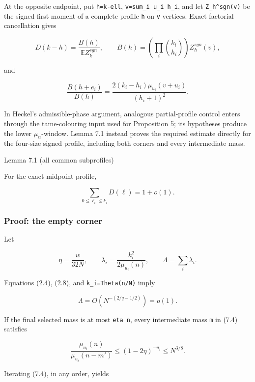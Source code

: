 \documentclass[
  11pt,
  a4paper,
]{article}
\begin{document}
At the opposite endpoint, put \texttt{h=k-ell},
\texttt{v=sum\_i\ u\_i\ h\_i}, and let \texttt{Z\_h\^{}sgn(v)} be the
signed first moment of a complete profile \texttt{h} on \texttt{v}
vertices. Exact factorial cancellation gives

\[
 D(k-h)=\frac{B(h)}{\mathbb EZ_k^{sgn}},\qquad
 B(h)=\left(\prod_i\binom{k_i}{h_i}\right)Z_h^{sgn}(v), \tag{7.5}
\]

and

\[
 \frac{B(h+e_i)}{B(h)}
 =\frac{2(k_i-h_i)\mu_{u_i}(v+u_i)}{(h_i+1)^2}.          \tag{7.6}
\]

In Heckel's admissible-phase argument, analogous partial-profile control
enters through the tame-colouring input used for Proposition 5; its
hypotheses produce the lower \(\mu_\alpha\)-window. Lemma 7.1 instead
proves the required estimate directly for the four-size signed profile,
including both corners and every intermediate mass.

{}
\label{lemma-7.1-all-common-subprofiles}
\begin{lemmabox}{Lemma 7.1 (all common subprofiles)}

For the exact midpoint profile,

\[
 \sum_{0\le\ell_i\le k_i}D(\ell)=1+o(1).               \tag{7.7}
\]

\end{lemmabox}

\subsubsection{Proof: the empty corner}\label{proof-the-empty-corner}

Let

\[
 \eta=\frac{w}{32N},\qquad
 \lambda_i=\frac{k_i^2}{2\mu_{u_i}(n)},\qquad
 \Lambda=\sum_i\lambda_i.                               \tag{7.8}
\]

Equations (2.4), (2.8), and \texttt{k\_i=Theta(n/N)} imply

\[
 \Lambda=O(N^{-(2/q-1/2)})=o(1).                        \tag{7.9}
\]

If the final selected mass is at most \texttt{eta\ n}, every
intermediate mass \texttt{m\textquotesingle{}} in (7.4) satisfies

\[
 \frac{\mu_{u_i}(n)}{\mu_{u_i}(n-m')}
 \le(1-2\eta)^{-u_i}\le N^{3/8}.                        \tag{7.10}
\]

Iterating (7.4), in any order, yields
\end{document}
